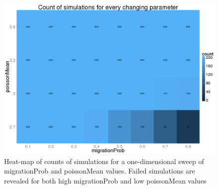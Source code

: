 \documentclass[a4paper,12pt]{report}
\begin{document}
\begin{figure}[ht]
	\centering
	\includegraphics[scale=0.3]{../data/count-2d.png}
	\caption{Heat-map of counts of simulations for a one-dimensional sweep of migrationProb and poissonMean values. Failed simulations are revealed for both high migrationProb and low poissonMean values}
	\label{app:count-2d}
\end{figure}
\end{document}
